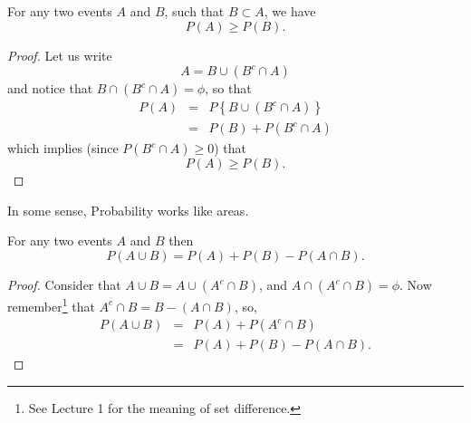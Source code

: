 \documentclass[notes=show, handout]{beamer}\usepackage[]{graphicx}\usepackage[]{color}
\newcommand{\bea}{\begin{eqnarray}}
\newcommand{\eea}{\end{eqnarray}}
\newcommand{\nn}{\nonumber}
\begin{document}
\begin{frame}{\secname}
  \begin{theorem}
  For any two events $A$ and $B$, such that $B \subset A$, we have
  $$
  P(A) \geq P(B).
  $$
  \end{theorem} \bigskip \pause
  \begin{footnotesize}
  \begin{proof}
  Let us write
  $$A = B \cup (B^c \cap A) $$
  and notice that $B \cap (B^c \cap A) = \phi$, so that
  \bea
  P(A) &=& P\left\{ B \cup (B^c \cap A)   \right\} \nn \\
  &=& P(B) + P(B^c \cap A) \nn
  \eea
  which implies (since $P(B^c \cap A) \geq 0$) that
  $$
  P(A) \geq   P(B).
  $$

  \end{proof}
  \end{footnotesize}
\end{frame}

\begin{frame}{\secname}
  \def\firstcircle{(3,1) circle (2.95cm)}
  \def\secondcircle{(1:3cm) circle (1.65cm)}

  \hspace{3cm} \vspace{2cm}
  \begin{center}
  In some sense, Probability works like areas.
  \end{center}
\end{frame}


\begin{frame}{\secname}
  \begin{theorem}
  For any two events $A$ and $B$ then
  $$
  P(A \cup B) = P(A) + P(B) - P(A \cap B).
  $$
  \end{theorem}
  \bigskip
  \pause
  \begin{footnotesize}
  \begin{proof}
  Consider that $A\cup B = A \cup (A^c \cap B)$, and $A\cap(A^c \cap B) = \phi$. Now remember\footnote{See Lecture 1 for the meaning of set difference.} that $A^c \cap B = B -(A \cap B)$, so,
  \bea
  P(A\cup B) &=& P(A) + P(A^c \cap B) \nn \\
  &=& P(A) + P(B) - P(A\cap B). \nn
  \eea

  \end{proof}
  \end{footnotesize}
\end{frame}
\end{document}
